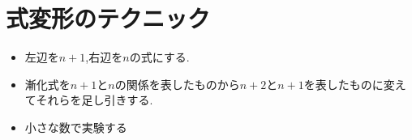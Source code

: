 
\section{式変形のテクニック}
\begin{itemize}
  \item 左辺を$n+1$,右辺を$n$の式にする.
  \item 漸化式を$n+1$と$n$の関係を表したものから$n+2$と$n+1$を表したものに変えてそれらを足し引きする.
  \item 小さな数で実験する
\end{itemize}
